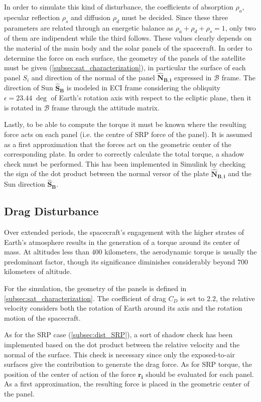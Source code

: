 In order to simulate this kind of disturbance, the coefficients of absorption $\rho_a$, specular reflection $\rho_s$ and diffusion $\rho_d$ must be decided. Since these three parameters are related through an energetic balance as $\rho_a + \rho_d + \rho_s = 1$, only two of them are indipendent while the third follows. These values clearly depends on the material of the main body and the solar panels of the spacecraft.
In order to determine the force on each surface, the geometry of the panels of the satellite must be given (\autoref{subsec:sat_characterization}), in particular the surface of each panel $S_i$ and direction of the normal of the panel $\boldsymbol{\hat{N}_{B,i}}$ expressed in $\mathcal{B}$ frame.
The direction of Sun $\boldsymbol{\hat{S}_B}$ is modeled in ECI frame considering the obliquity $\epsilon = 23.44 \; \deg$ of Earth's rotation axis with respect to the ecliptic plane, then it is rotated in $\mathcal{B}$ frame through the attitude matrix.

Lastly, to be able to compute the torque it must be known where the resulting force acts on each panel (i.e. the centre of SRP force of the panel). It is assumed as a first approximation that the forces act on the geometric center of the corresponding plate. In order to correctly calculate the total torque, a shadow check must be performed. This has been implemented in Simulink by checking the sign of the dot product between the normal versor of the plate $\boldsymbol{\hat{N}_{B,i}}$ and the Sun direction $\boldsymbol{\hat{S}_B}$.


\subsection{Drag Disturbance}
\label{subsec:dist_drag}

Over extended periods, the spacecraft's engagement with the higher strates of Earth's atmosphere results in the generation of a torque around its center of mass. At altitudes less than $400$ kilometers, the aerodynamic torque is usually the predominant factor, though its significance diminishes considerably beyond $700$ kilometers of altitude.

For the simulation, the geometry of the panels is defined in \autoref{subsec:sat_characterization}. The coefficient of drag $C_D$ is set to $2.2$, the relative velocity considers both the rotation of Earth around its axis and the rotation motion of the spacecraft.

As for the SRP case (\autoref{subsec:dist_SRP}), a sort of shadow check has been implemented based on the dot product between the relative velocity and the normal of the surface. This check is necessary since only the exposed-to-air surfaces give the contribution to generate the drag force.
As for SRP torque, the position of the center of action of the force $\boldsymbol{r_i}$ should be evaluated for each panel. As a first approximation, the resulting force is placed in the geometric center of the panel.


